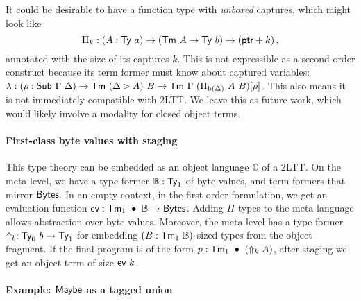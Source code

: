 It could be desirable to have a function type with \emph{unboxed} captures,
which might look like
\[
	\Pi_k : (A : \textsf{Ty}\ a) \to (\textsf{Tm}\ A \to \textsf{Ty}\ b) \to (\textsf{ptr} + k)  \,,
\]
annotated with the size of its captures $k$. This is not
expressible as a second-order construct because its term former must know about
captured variables:
$\lambda : (\rho : \syn{Sub}\ \Gamma\ \Delta) \to \Tm\ (\Delta \rhd A)\ B \to \Tm\ \Gamma\ (\Pi_{\textrm{b}(\Delta)}\ A\ B)[\rho]$.
This also means it is not immediately compatible with 2LTT. We leave this
as future work, which would likely involve a modality for closed object terms.


\paragraph{First-class byte values with staging}\label{layouts-staging}

This type theory can be embedded as an object language $\mathbb{O}$ of a 2LTT.
On the meta level, we have a type former $\mathbb{B} : \textsf{Ty}_1$ of byte
values, and term formers that mirror $\textsf{Bytes}$.
In an empty context, in the first-order formulation, we get an
evaluation function $\syn{ev} : \Tm_1\ \bullet\ \mathbb{B} \to \Bytes$.
Adding $\Pi$ types to the meta language
allows abstraction over byte values. Moreover, the meta level has a type former
$\Uparrow_b : \textsf{Ty}_0\ b \to \textsf{Ty}_1$ for embedding $(B : \Tm_1\ \mathbb{B})$-sized types from
the object fragment. If the final program is of the form $p :
	\textsf{Tm}_1\ \bullet\ (\Uparrow_k A)$, after staging we get an object term of size $\textsf{ev}\ k$.



\paragraph{Example: $\textsf{Maybe}$ as a tagged union}\label{maybe-as-a-tagged-union}


